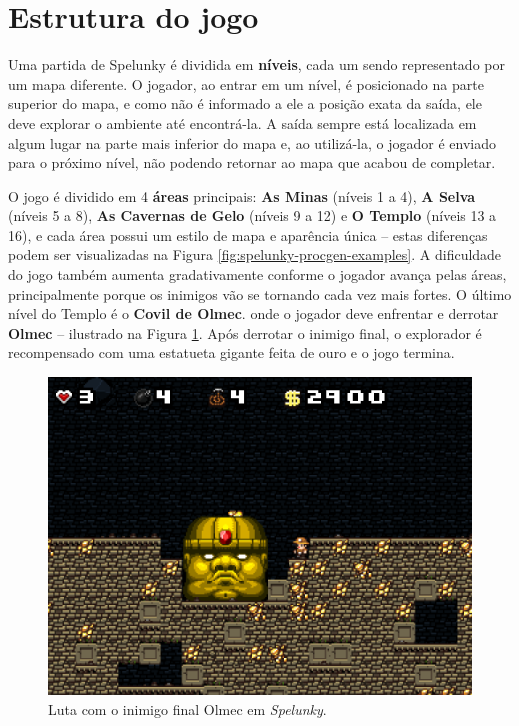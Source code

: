 \section{\label{section:spelunky-structure}Estrutura do jogo}
Uma partida de Spelunky é dividida em \textbf{níveis}, cada um sendo
representado por um mapa diferente. O jogador, ao entrar em um nível, é
posicionado na parte superior do mapa, e como não é informado a ele a posição
exata da saída, ele deve explorar o ambiente até encontrá-la. A saída sempre
está localizada em algum lugar na parte mais inferior do mapa e, ao utilizá-la,
o jogador é enviado para o próximo nível, não podendo retornar ao mapa que
acabou de completar.

O jogo é dividido em 4 \textbf{áreas} principais: \textbf{As Minas} (níveis 1 a
4), \textbf{A Selva} (níveis 5 a 8), \textbf{As Cavernas de Gelo} (níveis 9 a
12) e \textbf{O Templo} (níveis 13 a 16), e cada área possui um estilo de mapa e
aparência única -- estas diferenças podem ser visualizadas na Figura
\ref{fig:spelunky-procgen-examples}. A dificuldade do jogo também aumenta
gradativamente conforme o jogador avança pelas áreas, principalmente porque os
inimigos vão se tornando cada vez mais fortes. O último nível do Templo é o
\textbf{Covil de Olmec}. onde o jogador deve enfrentar e derrotar \textbf{Olmec}
-- ilustrado na Figura \ref{fig:spelunky-olmec}. Após derrotar o inimigo final,
o explorador é recompensado com uma estatueta gigante feita de ouro e o jogo
termina.

\begin{figure}[htb!]
\centering
\includegraphics[width=.65\textwidth]{fig/spelunky-olmec.png}
\caption{Luta com o inimigo final Olmec em \textit{Spelunky}.}
\label{fig:spelunky-olmec}
\end{figure}

